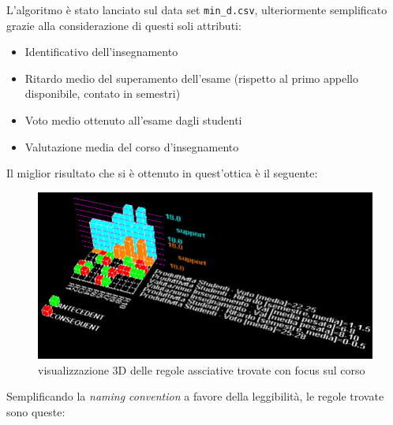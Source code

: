             L'algoritmo è stato lanciato sul data set \texttt{min\_d.csv}, ulteriormente semplificato grazie alla considerazione di questi soli attributi:

            \begin{itemize}
                \item Identificativo dell'insegnamento
                \item Ritardo medio del superamento dell'esame (rispetto al primo appello disponibile, contato in semestri)
                \item Voto medio ottenuto all'esame dagli studenti
                \item Valutazione media del corso d'insegnamento
            \end{itemize}

            Il miglior risultato che si è ottenuto in quest'ottica è il seguente:

            

            \begin{figure}
                \centering
                \caption{visualizzazione 3D delle regole assciative trovate con focus sul corso}
                \label{apriori_min_1}
	            \includegraphics[scale=0.5]{../ass/apriori_min_1.png}
            \end{figure}

            Semplificando la \textit{naming convention} a favore della leggibilità, le regole trovate sono queste:


